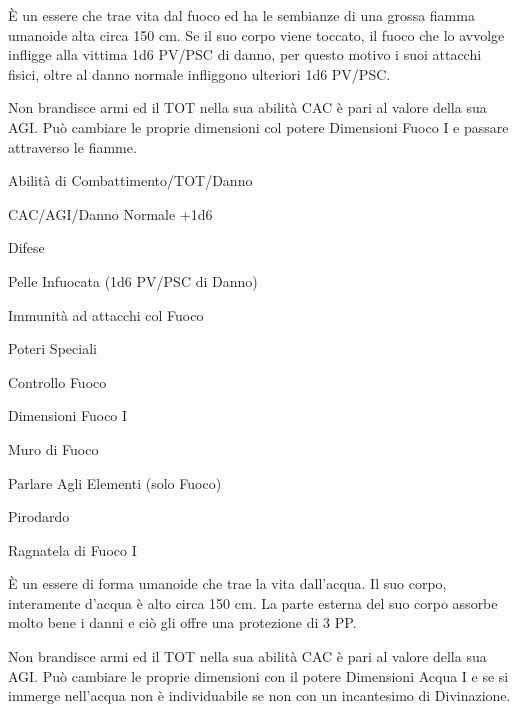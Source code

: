 \`E un essere che trae vita dal fuoco ed ha le sembianze di una grossa
fiamma umanoide alta circa 150 cm. Se il suo corpo viene toccato, il
fuoco che lo avvolge infligge alla vittima 1d6 PV/\-PSC di danno, per
questo motivo i suoi attacchi fisici, oltre al danno normale
infliggono ulteriori 1d6 PV/\-PSC.

Non brandisce armi ed il TOT nella sua abilit\`a CAC \`e pari al
valore della sua AGI. Pu\`o cambiare le proprie dimensioni col
potere Dimensioni Fuoco I e passare attraverso le fiamme. 


\begin{parmostro}{Abilit\`a di Combattimento/TOT/Danno}
\item  CAC/AGI/Danno Normale +1d6
\end{parmostro}

\begin{parmostro}{Difese} 
\item Pelle Infuocata (1d6 PV/PSC di Danno) 
\item Immunit\`a ad attacchi col Fuoco
\end{parmostro}

\begin{parmostro}{Poteri Speciali}
\item Controllo Fuoco
\item Dimensioni Fuoco I
\item Muro di Fuoco
\item Parlare Agli Elementi (solo Fuoco)
\item Pirodardo
\item Ragnatela di Fuoco I
\end{parmostro}


\`E un essere di forma umanoide che trae la vita dall'acqua. Il suo
corpo, interamente d'acqua \`e alto circa 150 cm.  La parte esterna
del suo corpo assorbe molto bene i danni e ci\`o gli offre una
protezione di 3 PP.


Non brandisce armi ed il TOT nella sua abilit\`a CAC \`e pari al
valore della sua AGI. Pu\`o cambiare le proprie dimensioni con il
potere Dimensioni Acqua I e se si immerge nell'acqua non \`e
individuabile se non con un incantesimo di Divinazione. 


